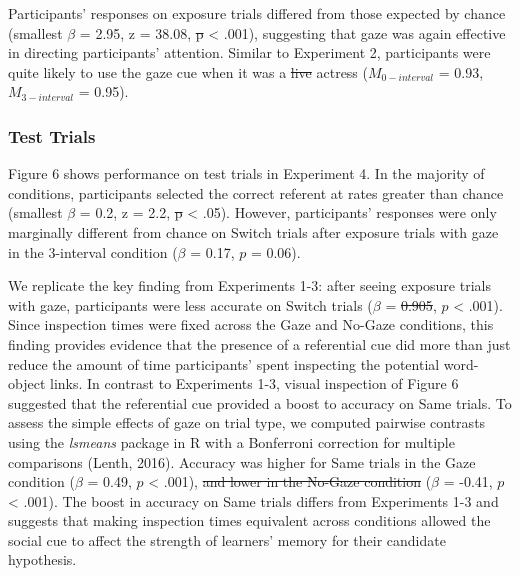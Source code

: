 \documentclass[authoryear, review]{elsarticle}
\providecommand{\DIFaddtex}[1]{{\protect\color{blue}\uwave{#1}}} %
\providecommand{\DIFdeltex}[1]{{\protect\color{red}\sout{#1}}}                      %
\providecommand{\DIFaddbegin}{} %
\providecommand{\DIFaddend}{} %
\providecommand{\DIFdelbegin}{} %
\providecommand{\DIFdelend}{} %
\providecommand{\DIFadd}[1]{\texorpdfstring{\DIFaddtex{#1}}{#1}} %
\providecommand{\DIFdel}[1]{\texorpdfstring{\DIFdeltex{#1}}{}} %
\begin{document}
Participants' responses on exposure trials differed from those expected
by chance (smallest \(\beta\) = 2.95, z = 38.08, \DIFdelbegin \DIFdel{p }\DIFdelend \DIFaddbegin \DIFadd{\(p\) }\DIFaddend \textless{}
.001), suggesting that gaze was again effective in directing
participants' attention. Similar to Experiment 2, participants were
quite likely to use the gaze cue when it was a \DIFdelbegin \DIFdel{live }\DIFdelend \DIFaddbegin \DIFadd{video of an }\DIFaddend actress
(\(M_{0-interval}\) = 0.93, \(M_{3-interval}\) = 0.95).

\subsubsection{Test Trials}\label{test-trials-3}

Figure 6 shows performance on test trials in Experiment 4. In the
majority of conditions, participants selected the correct referent at
rates greater than chance (smallest \(\beta\) = 0.2, z = 2.2, \DIFdelbegin \DIFdel{p
}\DIFdelend \DIFaddbegin \DIFadd{\(p\)
}\DIFaddend \textless{} .05). However, participants' responses were only marginally
different from chance on Switch trials after exposure trials with gaze
in the 3-interval condition (\(\beta\) = 0.17, \(p\) = 0.06).

We replicate the key finding from Experiments 1-3: after seeing exposure
trials with gaze, participants were less accurate on Switch trials
(\(\beta\) = \DIFdelbegin \DIFdel{0.905}\DIFdelend \DIFaddbegin \DIFadd{0.9}\DIFaddend , \(p\) \textless{} .001). Since inspection times were
fixed across the Gaze and No-Gaze conditions, this finding provides
evidence that the presence of a referential cue did more than just
reduce the amount of time participants' spent inspecting the potential
word-object links. In contrast to Experiments 1-3, visual inspection of
Figure 6 suggested that the referential cue provided a boost to accuracy
on Same trials. To assess the simple effects of gaze on trial type, we
computed pairwise contrasts using the \emph{lsmeans} package in R with a
Bonferroni correction for multiple comparisons (Lenth, 2016). Accuracy
was higher for Same trials in the Gaze condition (\(\beta\) = 0.49,
\(p\) \textless{} .001), \DIFdelbegin \DIFdel{and lower in the No-Gaze condition }\DIFdelend \DIFaddbegin \DIFadd{but lower for Switch trials }\DIFaddend (\(\beta\) = -0.41,
\(p\) \textless{} .001). The boost in accuracy on Same trials differs
from Experiments 1-3 and suggests that making inspection times
equivalent across conditions allowed the social cue to affect the
strength of learners' memory for their candidate hypothesis.
\end{document}
